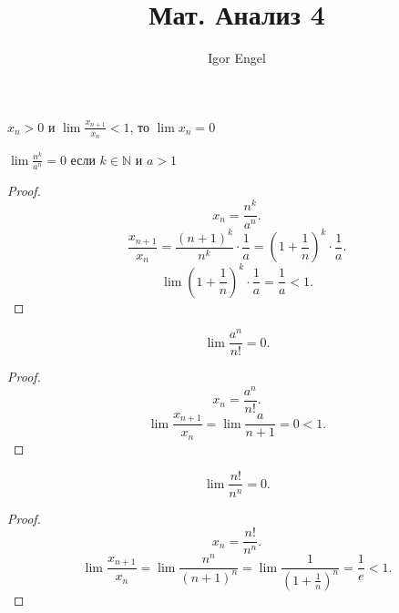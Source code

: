 \documentclass[11pt, oneside]{article}   	%
\title{Мат. Анализ 4}
\author{Igor Engel}
\date{}
\begin{document}
\maketitle
\section{}
    \begin{theorem}
        $x_n >0$ и  $\lim \frac{x_{n+1}}{x_n} < 1$, то $\lim x_n = 0$
    \end{theorem}    
    \begin{tlemma}
        $\lim \frac{n^{k}}{a^{n}}=0$ если $k\in \mathbb{N}$ и $a>1$
         \begin{proof}
             \[ x_n = \frac{n^{k}}{a^{n}} .\]
             \[ \frac{x_{n+1}}{x_n} = \frac{(n+1)^{k}}{n^{k}} \cdot \frac{1}{a} = \left(1+\frac{1}{n}\right)^{k} \cdot \frac{1}{a}.\]
         \[ \lim \left(1+\frac{1}{n}\right)^{k} \cdot \frac{1}{a} = \frac{1}{a} < 1  .\] 
        \end{proof}
    \end{tlemma}
    \begin{tlemma}
        \[ \lim \frac{a^{n}}{n!} = 0 .\]
        \begin{proof}
            \[ x_n = \frac{a^{n}}{n!} .\] 
            \[ \lim \frac{x_{n+1}}{x_n} = \lim \frac{a}{n+1} = 0 < 1.\] 
        \end{proof}
    \end{tlemma}
    \begin{tlemma}
        \[ \lim \frac{n!}{n^{n}} = 0 .\]
        \begin{proof}
            \[ x_n = \frac{n!}{n^{n}} .\]
            \[ \lim \frac{x_{n+1}}{x_n} = \lim \frac{n^{n}}{(n+1)^{n}} = \lim \frac{1}{(1+\frac{1}{n})^{n}} = \frac{1}{e} < 1 .\] 
        \end{proof}
    \end{tlemma}
\end{document}
